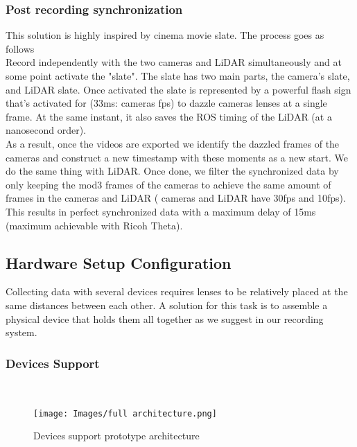 \documentclass[english, LaM, oneside]{sapthesis}%
\begin{document}
\subsubsection{Post recording synchronization} 
This solution is highly inspired by cinema movie slate. The process goes as follows \\
Record independently with the two cameras and LiDAR simultaneously and at some point activate the "slate".
The slate has two main parts, the camera's slate, and LiDAR slate.
Once activated the slate is represented by a powerful flash sign that's activated for (33ms: cameras fps) to dazzle cameras lenses at a single frame. At the same instant, it also saves the ROS timing of the LiDAR (at a nanosecond order).\\
As a result, once the videos are exported we identify the dazzled frames of the cameras and construct a new timestamp with these moments as a new start. We do the same thing with LiDAR.
Once done, we filter the synchronized data by only keeping the mod3 frames of the cameras to achieve the same amount of frames in the cameras and LiDAR ( cameras and LiDAR have 30fps and 10fps). This results in perfect synchronized data with a maximum delay of 15ms (maximum achievable with Ricoh Theta). \\

\subsection{Hardware Setup Configuration}
Collecting data with several devices requires lenses to be relatively placed at the same distances between each other. A solution for this task is to assemble a physical device that holds them all together as we suggest in our recording system.

\subsubsection{Devices Support} \
\newline
\begin{figure}[h] %
    \centering
    \texttt{[image: Images/full architecture.png]}
    \caption{Devices support prototype architecture}
    \label{fig:strangeb}
\end{figure}
\end{document}

